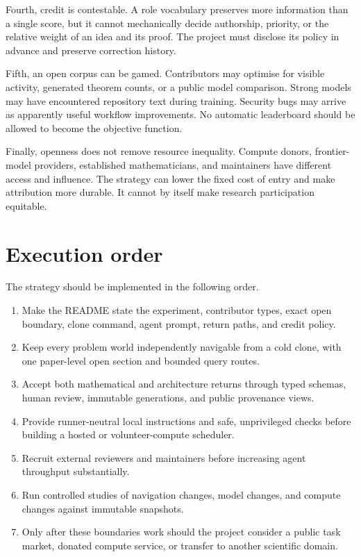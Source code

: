 \documentclass[10pt]{article}
\begin{document}
Fourth, credit is contestable.  A role vocabulary preserves more information
than a single score, but it cannot mechanically decide authorship, priority,
or the relative weight of an idea and its proof.  The project must disclose
its policy in advance and preserve correction history.

Fifth, an open corpus can be gamed.  Contributors may optimise for visible
activity, generated theorem counts, or a public model comparison.  Strong
models may have encountered repository text during training.  Security bugs
may arrive as apparently useful workflow improvements.  No automatic
leaderboard should be allowed to become the objective function.

Finally, openness does not remove resource inequality.  Compute donors,
frontier-model providers, established mathematicians, and maintainers have
different access and influence.  The strategy can lower the fixed cost of
entry and make attribution more durable.  It cannot by itself make research
participation equitable.

\section{Execution order}\label{sec:execution}

The strategy should be implemented in the following order.

\begin{enumerate}
\item Make the README state the experiment, contributor types, exact open
      boundary, clone command, agent prompt, return paths, and credit policy.
\item Keep every problem world independently navigable from a cold clone,
      with one paper-level open section and bounded query routes.
\item Accept both mathematical and architecture returns through typed schemas,
      human review, immutable generations, and public provenance views.
\item Provide runner-neutral local instructions and safe, unprivileged checks
      before building a hosted or volunteer-compute scheduler.
\item Recruit external reviewers and maintainers before increasing agent
      throughput substantially.
\item Run controlled studies of navigation changes, model changes, and compute
      changes against immutable snapshots.
\item Only after these boundaries work should the project consider a public
      task market, donated compute service, or transfer to another scientific
      domain.
\end{enumerate}
\end{document}
